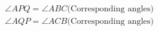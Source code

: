 \documentclass[preview]{standalone}
\begin{document}
\begin{align*}
\angle APQ = \angle ABC \text{(Corresponding angles)} \\ \angle AQP = \angle ACB \text{(Corresponding angles)}
\end{align*}
\end{document}
